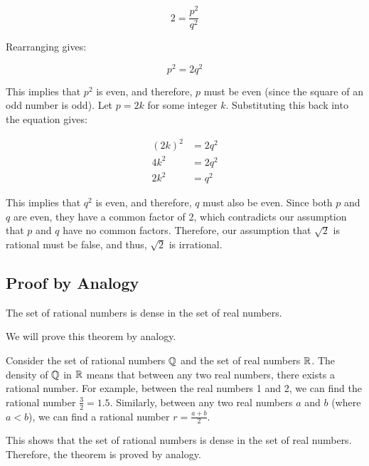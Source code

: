 \[
	2 = \frac{p^2}{q^2}
\]
	
Rearranging gives:

\[
	p^2 = 2q^2
\]
	
This implies that \( p^2 \) is even, and therefore, \(p\) must be even (since the square of an 
odd number is odd). Let \( p = 2k \) for some integer \(k\). Substituting this back into the 
equation gives:

\begin{align*}
{(2k)}^2 &= 2q^2\\	
4k^2 &= 2q^2\\
2k^2 &= q^2
\end{align*}

This implies that \( q^2 \) is even, and therefore, \(q\) must also be even.
Since both \(p\) and \(q\) are even, they have a common factor of 2, which contradicts our 
assumption that \(p\) and \(q\) have no common factors. Therefore, our assumption that 
\( \sqrt{2} \) is rational must be false, and thus, \( \sqrt{2} \) is irrational.

\QED

\subsection{Proof by Analogy}

The set of rational numbers is dense in the set of real numbers.

We will prove this theorem by analogy.

Consider the set of rational numbers \( \mathbb{Q} \) and the set of real numbers \( \mathbb{R} \). 
The density of \( \mathbb{Q} \) in \( \mathbb{R} \) means that between any two real numbers, there exists a 
rational number. For example, between the real numbers 1 and 2, we can find the rational 
number \( \frac{3}{2} = 1.5 \). Similarly, between any two real numbers \(a\) and \(b\) (where 
\( a < b \)), we can find a rational number \( r = \frac{a + b}{2} \).

This shows that the set of rational numbers is dense in the set of real numbers.
Therefore, the theorem is proved by analogy.

\QED

